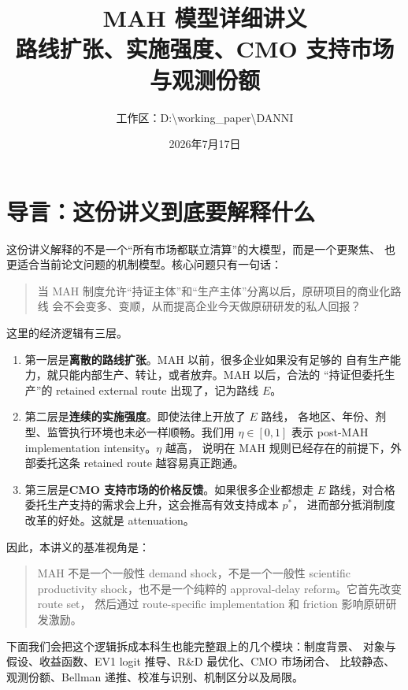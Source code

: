 \documentclass[12pt,UTF8]{ctexart}
\title{MAH 模型详细讲义\\
\large 路线扩张、实施强度、CMO 支持市场与观测份额}
\author{工作区：D:\textbackslash working\_paper\textbackslash DANNI}
\date{2026年7月17日}
\theoremstyle{plain}
\theoremstyle{remark}
\begin{document}
\maketitle
\tableofcontents
\bigskip

\section{导言：这份讲义到底要解释什么}

这份讲义解释的不是一个“所有市场都联立清算”的大模型，而是一个更聚焦、
也更适合当前论文问题的机制模型。核心问题只有一句话：

\begin{quote}
当 MAH 制度允许“持证主体”和“生产主体”分离以后，原研项目的商业化路线
会不会变多、变顺，从而提高企业今天做原研研发的私人回报？
\end{quote}

这里的经济逻辑有三层。

\begin{enumerate}[leftmargin=2em]
    \item 第一层是\textbf{离散的路线扩张}。MAH 以前，很多企业如果没有足够的
    自有生产能力，就只能内部生产、转让，或者放弃。MAH 以后，合法的
    “持证但委托生产”的 retained external route 出现了，记为路线 $E$。
    \item 第二层是\textbf{连续的实施强度}。即使法律上开放了 $E$ 路线，
    各地区、年份、剂型、监管执行环境也未必一样顺畅。我们用
    $\eta\in[0,1]$ 表示 post-MAH implementation intensity。$\eta$ 越高，
    说明在 MAH 规则已经存在的前提下，外部委托这条 retained route
    越容易真正跑通。
    \item 第三层是\textbf{CMO 支持市场的价格反馈}。如果很多企业都想走 $E$
    路线，对合格委托生产支持的需求会上升，这会推高有效支持成本 $p^*$，
    进而部分抵消制度改革的好处。这就是 attenuation。
\end{enumerate}

因此，本讲义的基准视角是：

\begin{quote}
MAH 不是一个一般性 demand shock，不是一个一般性 scientific productivity
shock，也不是一个纯粹的 approval-delay reform。它首先改变 route set，
然后通过 route-specific implementation 和 friction 影响原研研发激励。
\end{quote}

下面我们会把这个逻辑拆成本科生也能完整跟上的几个模块：制度背景、
对象与假设、收益函数、EV1 logit 推导、R\&D 最优化、CMO 市场闭合、
比较静态、观测份额、Bellman 递推、校准与识别、机制区分以及局限。
\end{document}
